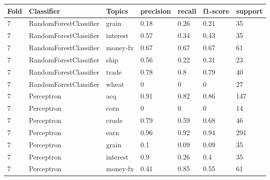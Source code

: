 \documentclass{article}
\begin{document}
\begin{table}[h]
\begin{tabular}{lllllll}
\textbf{Fold} & \textbf{Classifier}    & \textbf{Topics} & \textbf{precision} & \textbf{recall} & \textbf{f1-score} & \textbf{support} \\ \hline
7             & RandomForestClassifier & grain           & 0.18               & 0.26            & 0.21              & 35               \\
7             & RandomForestClassifier & interest        & 0.57               & 0.34            & 0.43              & 35               \\
7             & RandomForestClassifier & money-fx        & 0.67               & 0.67            & 0.67              & 61               \\
7             & RandomForestClassifier & ship            & 0.56               & 0.22            & 0.31              & 23               \\
7             & RandomForestClassifier & trade           & 0.78               & 0.8             & 0.79              & 40               \\
7             & RandomForestClassifier & wheat           & 0                  & 0               & 0                 & 27               \\
7             & Perceptron             & acq             & 0.91               & 0.82            & 0.86              & 147              \\
7             & Perceptron             & corn            & 0                  & 0               & 0                 & 14               \\
7             & Perceptron             & crude           & 0.79               & 0.59            & 0.68              & 46               \\
7             & Perceptron             & earn            & 0.96               & 0.92            & 0.94              & 291              \\
7             & Perceptron             & grain           & 0.1                & 0.09            & 0.09              & 35               \\
7             & Perceptron             & interest        & 0.9                & 0.26            & 0.4               & 35               \\
7             & Perceptron             & money-fx        & 0.41               & 0.85            & 0.55              & 61               \\

\end{tabular}
\end{table}
\end{document}
